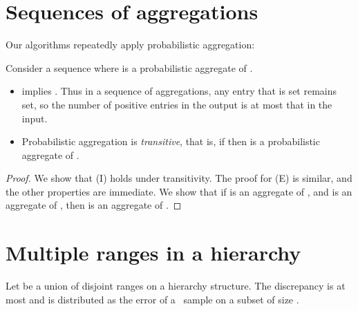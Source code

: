 \documentclass[11pt]{article}
\begin{document}

\section{Sequences of aggregations}
\label{probaggapp}
\noindent
Our algorithms repeatedly apply probabilistic aggregation:

\begin{lemma}\label{lemma:a}
 Consider a sequence  where
 is a probabilistic aggregate of .
\begin{itemize}
\item
 implies .  
Thus in a sequence of aggregations, 
any entry that is set remains set, so
the number of positive entries in the output is
at most that in the input.
\item
Probabilistic aggregation is {\em transitive}, that is, if  then
 is a probabilistic aggregate of .
\end{itemize}
\end{lemma}

\begin{proof}
We show that (I) holds under transitivity.  The proof for (E) is
similar, and the other properties are immediate.
We show that if  is an aggregate of , and 
 is an aggregate of , then
 is an aggregate of .



\end{proof}

\section{Multiple ranges in a hierarchy} 
\label{mrangeH:sec}

 \begin{lemma} \label{hierarcyunionbound:lemma}
Let  be a union of  disjoint ranges  on a
hierarchy structure. 
The discrepancy is at most  and is distributed
as the error of a \varopt\ sample on a subset of size
.
\end{lemma}
\end{document}
